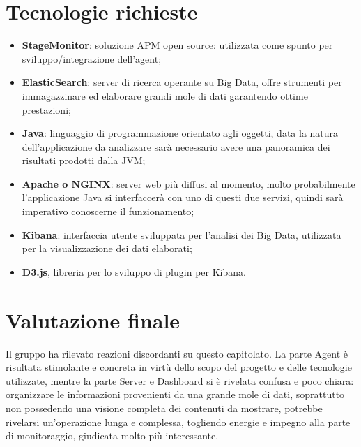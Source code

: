 \documentclass[StudioDiFattibilità.tex]{subfiles}
\begin{document}
\section{Tecnologie richieste}
\begin{itemize}
	\item \textbf{StageMonitor}: soluzione APM open source: utilizzata come spunto per sviluppo/integrazione dell'agent;
	\item \textbf{ElasticSearch}: server di ricerca operante su Big Data, offre strumenti per immagazzinare ed elaborare grandi mole di dati garantendo ottime prestazioni;
	\item \textbf{Java}: linguaggio di programmazione orientato agli oggetti, data la natura dell'applicazione da analizzare sarà necessario avere una panoramica dei risultati prodotti dalla JVM;
	\item \textbf{Apache o NGINX}: server web più diffusi al momento, molto probabilmente l'applicazione Java si interfaccerà con uno di questi due servizi, quindi sarà imperativo conoscerne il funzionamento;
	\item \textbf{Kibana}: interfaccia utente sviluppata per l'analisi dei Big Data, utilizzata per la visualizzazione dei dati elaborati;
	\item \textbf{D3.js}, libreria  per lo sviluppo di plugin per Kibana.
\end{itemize}
\section{Valutazione finale}
Il gruppo ha rilevato reazioni discordanti su questo capitolato. La parte Agent è risultata stimolante e concreta in virtù dello scopo del progetto e delle tecnologie utilizzate, mentre la parte Server e Dashboard si è rivelata confusa e poco chiara: organizzare le informazioni provenienti da una grande mole di dati, soprattutto non possedendo una visione completa dei contenuti da mostrare, potrebbe rivelarsi un'operazione lunga e complessa, togliendo energie e impegno alla parte di monitoraggio, giudicata molto più interessante.  
\end{document}
